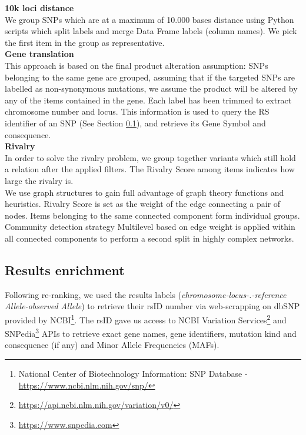 \textbf{10k loci distance}\\
We group SNPs which are at a maximum of 10.000 bases distance using Python scripts which split labels and merge Data Frame labels (column names). We pick the first item in the group as representative.
\\

\textbf{Gene translation}\\
This approach is based on the final product alteration assumption: SNPs belonging to the same gene are grouped, assuming that if the targeted SNPs are labelled as non-synonymous mutations, we assume the product will be altered by any of the items contained in the gene. Each label has been trimmed to extract chromosome number and locus. This information is used to query the RS identifier of an SNP (See Section \ref{section:rsid}), and retrieve its Gene Symbol and consequence.
\\

\textbf{Rivalry}\\
In order to solve the rivalry problem, we group together variants which still hold a relation after the applied filters. The Rivalry Score among items indicates how large the rivalry is.
\\

We use graph structures to gain full advantage of graph theory functions and heuristics. Rivalry Score is set as the weight of the edge connecting a pair of nodes. 
Items belonging to the same connected component form individual groups. Community detection strategy Multilevel \cite{Blondel2008FastNetworks} based on edge weight is applied within all connected components to perform a second split in highly complex networks.
\\

\subsection{Results enrichment}
\label{section:rsid}
Following re-ranking, we used the results labels (\emph{chromosome-locus-.-reference Allele-observed Allele}) to retrieve their rsID number via web-scrapping on dbSNP provided by NCBI\footnote{National Center of Biotechnology Information: SNP Database - \url{https://www.ncbi.nlm.nih.gov/snp/}}. The rsID gave us access to NCBI Variation Services\footnote{\url{https://api.ncbi.nlm.nih.gov/variation/v0/}} and SNPedia\footnote{\url{https://www.snpedia.com}} APIs to retrieve exact gene names, gene identifiers, mutation kind and consequence (if any) and Minor Allele Frequencies (MAFs).

